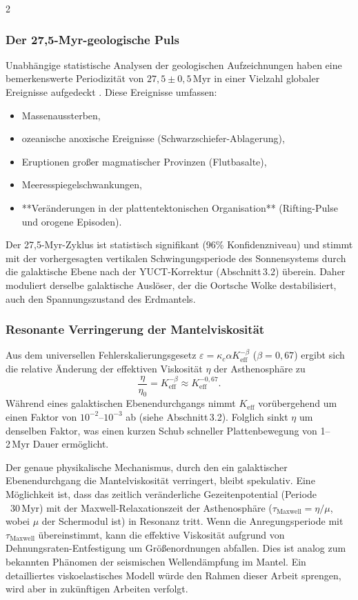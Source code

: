 \documentclass[11pt,a4paper]{article}
\begin{document}
\begin{multicols}{2}
		\subsubsection{Der 27,5-Myr-geologische Puls}
		
		Unabhängige statistische Analysen der geologischen Aufzeichnungen haben eine bemerkenswerte Periodizität
		von \(27,5 \pm 0,5\) Myr in einer Vielzahl globaler Ereignisse aufgedeckt \cite{Rampino2021,Rampino2023}.
		Diese Ereignisse umfassen:
		\begin{itemize}
			\item Massenaussterben,
			\item ozeanische anoxische Ereignisse (Schwarzschiefer-Ablagerung),
			\item Eruptionen großer magmatischer Provinzen (Flutbasalte),
			\item Meeresspiegelschwankungen,
			\item **Veränderungen in der plattentektonischen Organisation** (Rifting-Pulse und orogene Episoden).
		\end{itemize}
		Der 27,5-Myr-Zyklus ist statistisch signifikant (96\% Konfidenzniveau) und stimmt mit der vorhergesagten
		vertikalen Schwingungsperiode des Sonnensystems durch die galaktische Ebene nach der YUCT-Korrektur
		(Abschnitt 3.2) überein. Daher moduliert derselbe galaktische Auslöser, der die Oortsche Wolke destabilisiert, auch den Spannungszustand des Erdmantels.
		
		\subsubsection{Resonante Verringerung der Mantelviskosität}
		
		Aus dem universellen Fehlerskalierungsgesetz \(\varepsilon = \kappa_c \alpha K_{\mathrm{eff}}^{-\beta}\)
		(\(\beta=0,67\)) ergibt sich die relative Änderung der effektiven Viskosität \(\eta\) der Asthenosphäre zu
		\[
		\frac{\eta}{\eta_0} = K_{\mathrm{eff}}^{-\beta} \approx K_{\mathrm{eff}}^{-0,67}.
		\]
		Während eines galaktischen Ebenendurchgangs nimmt \(K_{\mathrm{eff}}\) vorübergehend um einen Faktor von
		\(10^{-2}\)–\(10^{-3}\) ab (siehe Abschnitt 3.2). Folglich sinkt \(\eta\) um denselben Faktor,
		was einen kurzen Schub schneller Plattenbewegung von 1–2 Myr Dauer ermöglicht.
		
		Der genaue physikalische Mechanismus, durch den ein galaktischer Ebenendurchgang die Mantelviskosität verringert, bleibt spekulativ. Eine Möglichkeit ist, dass das zeitlich veränderliche Gezeitenpotential (Periode ~30 Myr) mit der Maxwell-Relaxationszeit der Asthenosphäre (\(\tau_{\mathrm{Maxwell}} = \eta/\mu\), wobei \(\mu\) der Schermodul ist) in Resonanz tritt. Wenn die Anregungsperiode mit \(\tau_{\mathrm{Maxwell}}\) übereinstimmt, kann die effektive Viskosität aufgrund von Dehnungsraten-Entfestigung um Größenordnungen abfallen. Dies ist analog zum bekannten Phänomen der seismischen Wellendämpfung im Mantel. Ein detailliertes viskoelastisches Modell würde den Rahmen dieser Arbeit sprengen, wird aber in zukünftigen Arbeiten verfolgt.
		

\end{multicols}
\end{document}
